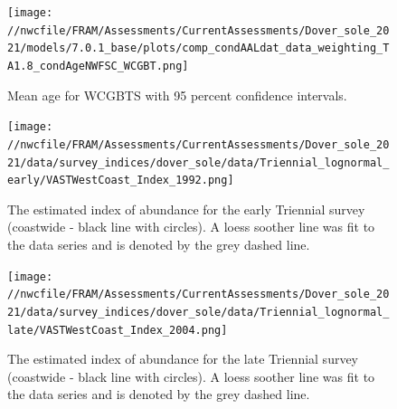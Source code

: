 \documentclass[11pt,
  english,
  a4paper,
]{article}
\begin{document}
\begin{figure}
\centering
\texttt{[image: //nwcfile/FRAM/Assessments/CurrentAssessments/Dover\_sole\_2021/models/7.0.1\_base/plots/comp\_condAALdat\_data\_weighting\_TA1.8\_condAgeNWFSC\_WCGBT.png]}
\caption{Mean age for WCGBTS with 95 percent confidence intervals.\label{fig:mean-wcgbt-age-data}}
\end{figure}

\tagmcend\tagstructend

\newpage


\begin{figure}
\centering
\texttt{[image: //nwcfile/FRAM/Assessments/CurrentAssessments/Dover\_sole\_2021/data/survey\_indices/dover\_sole/data/Triennial\_lognormal\_early/VASTWestCoast\_Index\_1992.png]}
\caption{The estimated index of abundance for the early Triennial survey (coastwide - black line with circles). A loess soother line was fit to the data series and is denoted by the grey dashed line.\label{fig:tri-early-index}}
\end{figure}

\tagmcend\tagstructend

\clearpage


\begin{figure}
\centering
\texttt{[image: //nwcfile/FRAM/Assessments/CurrentAssessments/Dover\_sole\_2021/data/survey\_indices/dover\_sole/data/Triennial\_lognormal\_late/VASTWestCoast\_Index\_2004.png]}
\caption{The estimated index of abundance for the late Triennial survey (coastwide - black line with circles). A loess soother line was fit to the data series and is denoted by the grey dashed line.\label{fig:tri-late-index}}
\end{figure}

\tagmcend\tagstructend

\clearpage

\end{document}
